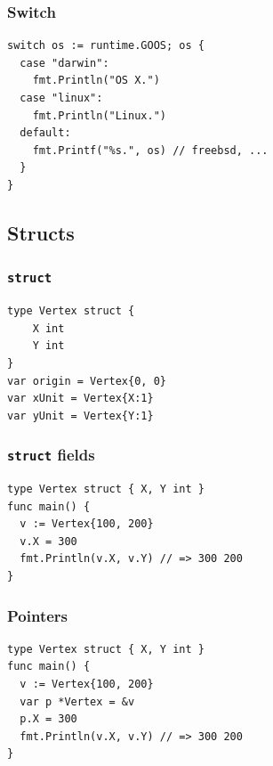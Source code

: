 \documentclass[xetex,mathserif,serif,12pt]{beamer}
\begin{document}
\begin{frame}[fragile]
  \frametitle{Switch}

  \begin{beamer@nomargin}
    \begin{lstlisting}
switch os := runtime.GOOS; os {
  case "darwin":
    fmt.Println("OS X.")
  case "linux":
    fmt.Println("Linux.")
  default:
    fmt.Printf("%s.", os) // freebsd, ...
  }
}
    \end{lstlisting}
  \end{beamer@nomargin}
\end{frame}

\subsection{Structs}

\begin{frame}[fragile]
  \frametitle{\texttt{struct}}

  \begin{beamer@nomargin}
    \begin{lstlisting}
type Vertex struct {
    X int
    Y int
}
var origin = Vertex{0, 0}
var xUnit = Vertex{X:1}
var yUnit = Vertex{Y:1}
    \end{lstlisting}
  \end{beamer@nomargin}
\end{frame}

\begin{frame}[fragile]
  \frametitle{\texttt{struct} fields}

  \begin{beamer@nomargin}
    \begin{lstlisting}
type Vertex struct { X, Y int }
func main() {
  v := Vertex{100, 200}
  v.X = 300
  fmt.Println(v.X, v.Y) // => 300 200
}
    \end{lstlisting}
  \end{beamer@nomargin}
\end{frame}

\begin{frame}[fragile]
  \frametitle{Pointers}

  \begin{beamer@nomargin}
    \begin{lstlisting}
type Vertex struct { X, Y int }
func main() {
  v := Vertex{100, 200}
  var p *Vertex = &v
  p.X = 300
  fmt.Println(v.X, v.Y) // => 300 200
}
    \end{lstlisting}
  \end{beamer@nomargin}
\end{frame}
\end{document}
